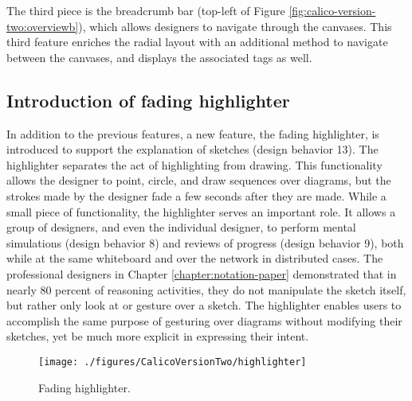 \documentclass[12pt,fleqn]{ucithesis}
\begin{document}
The third piece is the breadcrumb bar (top-left of Figure \ref{fig:calico-version-two:overviewb}), which allows designers to navigate through the canvases. This third feature enriches the radial layout with an additional method to navigate between the canvases, and displays the associated tags as well.

\subsection{Introduction of fading highlighter}

In addition to the previous features, a new feature, the fading highlighter, is introduced to support the explanation of sketches (design behavior 13). The highlighter separates the act of highlighting from drawing. This functionality allows the designer to point, circle, and draw sequences over diagrams, but the strokes made by the designer fade a few seconds after they are made. While a small piece of functionality, the highlighter serves an important role. It allows a group of designers, and even the individual designer, to perform mental simulations (design behavior 8) and reviews of progress (design behavior 9), both while at the same whiteboard and over the network in distributed cases. The professional designers in Chapter \ref{chapter:notation-paper} demonstrated that in nearly 80 percent of reasoning activities, they do not manipulate the sketch itself, but rather only look at or gesture over a sketch. The highlighter enables users to accomplish the same purpose of gesturing over diagrams without modifying their sketches, yet be much more explicit in expressing their intent.

\begin{figure*}[tbh]
  \centering
  \texttt{[image: ./figures/CalicoVersionTwo/highlighter]}
  \caption{Fading highlighter.}
  \label{fig:calico-version-two:overviewd}
\end{figure*}

\end{document}
